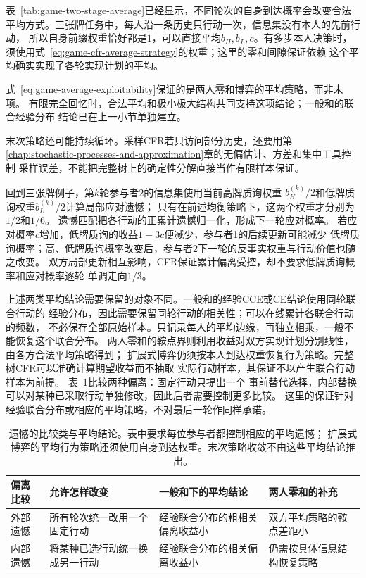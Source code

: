 表~\ref{tab:game-two-stage-average}已经显示，不同轮次的自身到达概率会改变合法
平均方式。三张牌任务中，每人沿一条历史只行动一次，信息集没有本人的先前行动，
所以自身前缀权重恰好都是\(1\)，可以直接平均\(b_H,b_L,c\)。有多步本人决策时，
须使用式~\eqref{eq:game-cfr-average-strategy}的权重；这里的零和间隙保证依赖
这个平均确实实现了各轮实现计划的平均。

式~\eqref{eq:game-average-exploitability}保证的是两人零和博弈的平均策略，而非末项。
有限完全回忆时，合法平均和极小极大结构共同支持这项结论；一般和的联合经验分布
结论已在上一小节单独建立。

末次策略还可能持续循环。采样CFR若只访问部分历史，还要用第
\ref{chap:stochastic-processes-and-approximation}章的无偏估计、方差和集中工具控制
采样误差，不能把完整树上的确定性分解直接当作有限样本保证。

回到三张牌例子，第\(k\)轮参与者2的信息集使用当前高牌质询权重
\(b_H^{(k)}/2\)和低牌质询权重\(b_L^{(k)}/2\)计算局部应对遗憾；
只有在前述均衡策略下，这两个权重才分别为\(1/2\)和\(1/6\)。
遗憾匹配把各行动的正累计遗憾归一化，形成下一轮应对概率。
若应对概率\(c\)增加，低牌质询的收益\(1-3c\)便减少，参与者1的后续更新可能减少
低牌质询概率；高、低牌质询概率改变后，参与者2下一轮的反事实权重与行动价值也随之改变。
双方局部更新相互影响，CFR保证累计偏离受控，却不要求低牌质询概率和应对概率逐轮
单调走向\(1/3\)。

上述两类平均结论需要保留的对象不同。一般和的经验CCE或CE结论使用同轮联合行动的
经验分布，因此需要保留同轮行动的相关性；可以在线累计各联合行动的频数，
不必保存全部原始样本。只记录每人的平均边缘，再独立相乘，一般不能恢复这个联合分布。
两人零和的鞍点界则利用收益对双方实现计划分别线性，由各方合法平均策略得到；
扩展式博弈仍须按本人到达权重恢复行为策略。完整树CFR可以准确计算期望收益而不抽取
实际行动样本，其保证不以产生联合行动样本为前提。
表~\ref{tab:game-regret-comparison-conclusions}比较两种偏离：固定行动只提出一个
事前替代选择，内部替换可以对某种已采取行动单独修改，因此后者需要控制更多比较。
这里的保证针对经验联合分布或相应的平均策略，不对最后一轮作同样承诺。

\begin{table}[htbp]
  \centering
  \begin{tabularx}{\linewidth}{lXXX}
    \toprule
    偏离比较 & 允许怎样改变 & 一般和下的平均结论 & 两人零和的补充\\
    \midrule
    外部遗憾 & 所有轮次统一改用一个固定行动 & 经验联合分布的粗相关偏离收益小 & 双方平均策略的鞍点差距小\\
    内部遗憾 & 将某种已选行动统一换成另一行动 & 经验联合分布的相关偏离收益小 & 仍需按具体信息结构恢复策略\\
    \bottomrule
  \end{tabularx}
  \caption{遗憾的比较类与平均结论。表中要求每位参与者都控制相应的平均遗憾；
  扩展式博弈的平均行为策略还须使用自身到达权重。末次策略收敛不由这些平均结论推出。}
  \label{tab:game-regret-comparison-conclusions}
\end{table}

